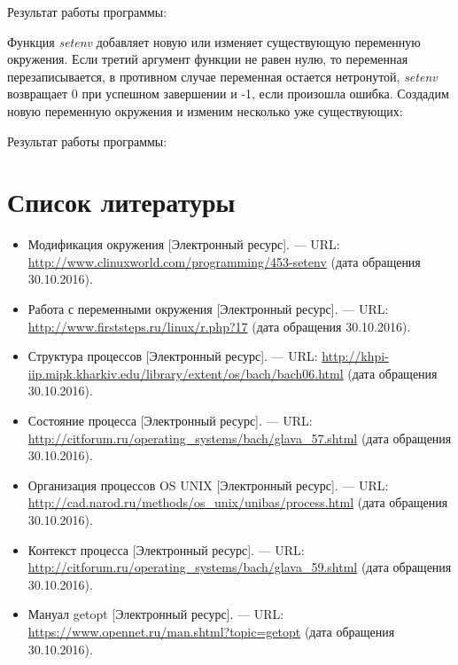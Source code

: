 \documentclass[14pt,a4paper,report]{report}
\begin{document}


Результат работы программы:



Функция \emph{setenv} добавляет новую или изменяет существующую переменную окружения. Если третий аргумент функции не равен нулю, то переменная перезаписывается, в противном случае переменная остается нетронутой, \emph{setenv} возвращает 0 при успешном завершении и -1, если произошла ошибка. Создадим новую переменную окружения и изменим несколько уже существующих:



Результат работы программы:



\section{Список литературы}

\begin{itemize}
	\item Модификация окружения [Электронный ресурс]. — URL: \href{http://www.clinuxworld.com/programming/453-setenv}{http://www.clinuxworld.com/programming/453-setenv} (дата обращения 30.10.2016).
	
	\item Работа с переменными окружения [Электронный ресурс]. — URL: \href{http://www.firststeps.ru/linux/r.php?17}{http://www.firststeps.ru/linux/r.php?17} (дата обращения 30.10.2016).
	
	\item Структура процессов [Электронный ресурс]. — URL: \href{http://khpi-iip.mipk.kharkiv.edu/library/extent/os/bach/bach06.html}{http://khpi-iip.mipk.kharkiv.edu/library/extent/os/ba\linebreak ch/bach06.html} (дата обращения 30.10.2016).
	
	\item Состояние процесса [Электронный ресурс]. — URL: \href{http://citforum.ru/operating_systems/bach/glava_57.shtml}{http://citforum.ru/operating\_systems/bach/glava\_57.s\linebreak html} (дата обращения 30.10.2016).
	
	\item Организация процессов OS UNIX [Электронный ресурс]. — URL: \href{http://cad.narod.ru/methods/os_unix/unibas/process.html}{http://cad.narod.ru/methods/os\_unix/un\linebreak ibas/process.html} (дата обращения 30.10.2016).
	
	\item Контекст процесса [Электронный ресурс]. — URL: \href{http://citforum.ru/operating_systems/bach/glava_59.shtml}{http://citforum.ru/operating\_systems/bach/glava\_59.sh\linebreak tml} (дата обращения 30.10.2016).
	
	\item Мануал getopt [Электронный ресурс]. — URL: \href{https://www.opennet.ru/man.shtml?topic=getopt}{https://www.opennet.ru/man.shtml?topic=getopt} (дата обращения 30.10.2016).
\end{itemize}
\end{document}
